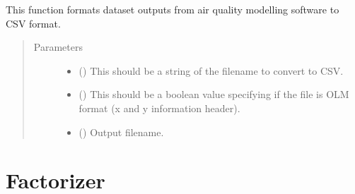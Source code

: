 \documentclass[letterpaper,10pt,english,openany,oneside]{sphinxmanual}
\begin{document}
\begin{fulllineitems}
\label{\detokenize{index:CSVFormatter.csvformatter}}
This function formats dataset outputs from air quality modelling software to CSV format.
\begin{quote}\begin{description}
\item[{Parameters}] \leavevmode\begin{itemize}
\item {} 
 () \textendash{} This should be a string of the filename to convert to CSV.

\item {} 
 () \textendash{} This should be a boolean value specifying if the file is OLM format (x and y information header).

\item {} 
 () \textendash{} Output filename.

\end{itemize}

\end{description}\end{quote}

\end{fulllineitems}



\chapter{Factorizer}
\label{\detokenize{index:module-Factorizer}}\label{\detokenize{index:factorizer}}
\end{document}
